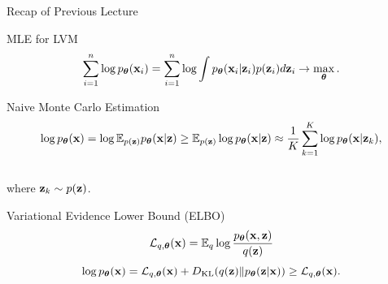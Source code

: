 \documentclass{beamer}
\begin{document}
\begin{frame}
	\titlepage
	\resetonslide
\end{frame}
\begin{frame}{Recap of Previous Lecture}
	\begin{block}{MLE for LVM}
		\vspace{-0.3cm}
		\[
			\sum_{i=1}^n \log p_{\boldsymbol{\theta}}(\mathbf{x}_i) = \sum_{i=1}^n \log \int p_{\boldsymbol{\theta}}(\mathbf{x}_i| \mathbf{z}_i) p(\mathbf{z}_i) d\mathbf{z}_i \rightarrow \max_{\boldsymbol{\theta}}.
		\]
		\vspace{-0.3cm}
	\end{block}
	\begin{block}{Naive Monte Carlo Estimation}
		\vspace{-0.7cm}
		\[
			\log p_{\boldsymbol{\theta}}(\mathbf{x}) = \log \mathbb{E}_{p(\mathbf{z})} p_{\boldsymbol{\theta}}(\mathbf{x} | \mathbf{z}) \geq \mathbb{E}_{p(\mathbf{z})} \log p_{\boldsymbol{\theta}}(\mathbf{x} | \mathbf{z}) \approx \frac{1}{K} \sum_{k=1}^{K} \log p_{\boldsymbol{\theta}}(\mathbf{x} | \mathbf{z}_k),
		\]
		\vspace{-0.5cm} \\
		where $\mathbf{z}_k \sim p(\mathbf{z})$. 
	\end{block}
	\begin{block}{Variational Evidence Lower Bound (ELBO)}
		\vspace{-0.3cm}
		\[
			\mathcal{L}_{q, \boldsymbol{\theta}}(\mathbf{x}) = \mathbb{E}_{q} \log \frac{p_{\boldsymbol{\theta}}(\mathbf{x}, \mathbf{z})}{q(\mathbf{z})}
		\]
		\vspace{-0.3cm}
		\[
			\log p_{\boldsymbol{\theta}}(\mathbf{x}) = \mathcal{L}_{q, \boldsymbol{\theta}}(\mathbf{x}) + D_\mathrm{KL}(q(\mathbf{z}) \| p_{\boldsymbol{\theta}}(\mathbf{z}|\mathbf{x})) \geq \mathcal{L}_{q, \boldsymbol{\theta}}(\mathbf{x}).
		\]
	\end{block}
\end{frame}
\end{document}
